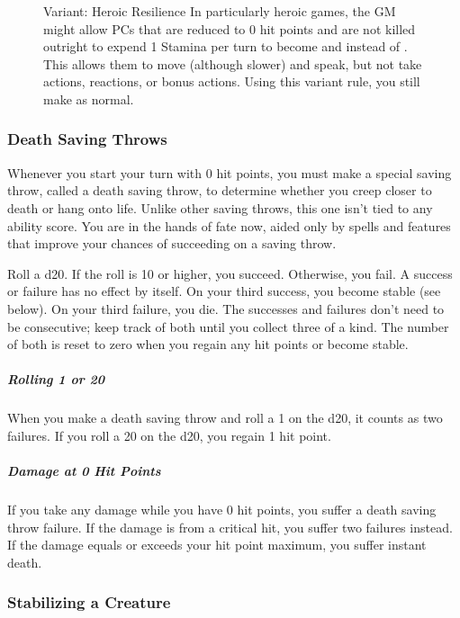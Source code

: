 \begin{figure}
	\begin{DndComment}{Variant: Heroic Resilience}
		In particularly heroic games, the GM might allow PCs that are reduced to 0 hit points and are not killed outright to expend 1 Stamina per turn to become  and  instead of . This allows them to move (although slower) and speak, but not take actions, reactions, or bonus actions. Using this variant rule, you still make  as normal.
	\end{DndComment}
\end{figure}

\subsubsection{Death Saving Throws} \label{sec:death-saves}

Whenever you start your turn with 0 hit points, you must make a special saving throw, called a death saving throw, to determine whether you creep closer to death or hang onto life. Unlike other saving throws, this one isn't tied to any ability score. You are in the hands of fate now, aided only by spells and features that improve your chances of succeeding on a saving throw.

Roll a d20. If the roll is 10 or higher, you succeed. Otherwise, you fail. A success or failure has no effect by itself. On your third success, you become stable (see below). On your third failure, you die. The successes and failures don't need to be consecutive; keep track of both until you collect three of a kind. The number of both is reset to zero when you regain any hit points or become stable.

\subparagraph*{Rolling 1 or 20} When you make a death saving throw and roll a 1 on the d20, it counts as two failures. If you roll a 20 on the d20, you regain 1 hit point.

\subparagraph*{Damage at 0 Hit Points} If you take any damage while you have 0 hit points, you suffer a death saving throw failure. If the damage is from a critical hit, you suffer two failures instead. If the damage equals or exceeds your hit point maximum, you suffer instant death.

\subsubsection{Stabilizing a Creature}

